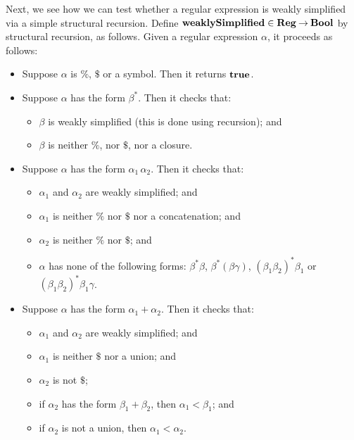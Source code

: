 Next, we see how we can test whether a regular expression is weakly
simplified via a simple structural recursion.  Define
%
$\mathbf{weaklySimplified}\in\mathbf{Reg}\mathbin{\to}\mathbf{Bool}$ by structural recursion, as
follows.  Given a regular expression $\alpha$, it proceeds as follows:
\begin{itemize}
\item Suppose $\alpha$ is $\%$, $\$$ or a symbol.  Then it returns $\mathbf{true}$.

\item Suppose $\alpha$ has the form $\beta^*$.  Then it checks that:
  \begin{itemize}
  \item $\beta$ is weakly simplified (this is done using recursion); and

  \item $\beta$ is neither $\%$, nor $\$$, nor a closure.
  \end{itemize}

\item Suppose $\alpha$ has the form $\alpha_1\,\alpha_2$.  Then it
  checks that:
  \begin{itemize}
  \item $\alpha_1$ and $\alpha_2$ are weakly simplified; and

  \item $\alpha_1$ is neither $\%$ nor $\$$ nor a concatenation; and

  \item $\alpha_2$ is neither $\%$ nor $\$$; and

  \item $\alpha$ has none of the following forms: $\beta^*\beta$,
    $\beta^*(\beta\gamma)$, $(\beta_1\beta_2)^*\beta_1$ or
    $(\beta_1\beta_2)^*\beta_1\gamma$.
  \end{itemize}
  
\item Suppose $\alpha$ has the form $\alpha_1 + \alpha_2$.  Then it
  checks that:
  \begin{itemize}
  \item $\alpha_1$ and $\alpha_2$ are weakly simplified; and

  \item $\alpha_1$ is neither $\$$ nor a union; and

  \item $\alpha_2$ is not $\$$;

  \item if $\alpha_2$ has the form $\beta_1 + \beta_2$, then
    $\alpha_1<\beta_1$; and

  \item if $\alpha_2$ is not a union, then $\alpha_1<\alpha_2$.
  \end{itemize}
\end{itemize}

